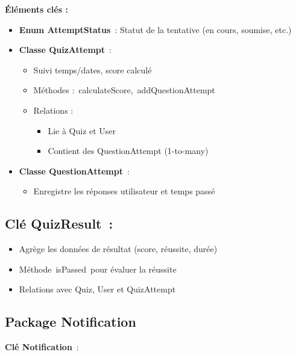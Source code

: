 \documentclass[12pt,a4paper,twoside]{report}
\begin{document}
\textbf{Éléments clés :}

\begin{itemize}
\item
  \textbf{Enum AttemptStatus}~: Statut de la tentative (en cours,
  soumise, etc.)
\item
  \textbf{Classe QuizAttempt}~:

  \begin{itemize}
  \item
    Suivi temps/dates, score calculé
  \item
    Méthodes :~calculateScore,~addQuestionAttempt
  \item
    Relations :

    \begin{itemize}
    \item
      Lie à Quiz et User
    \item
      Contient des QuestionAttempt (1-to-many)
    \end{itemize}
  \end{itemize}
\item
  \textbf{Classe QuestionAttempt}~:

  \begin{itemize}
  \item
    Enregistre les réponses utilisateur et temps passé
  \end{itemize}
\end{itemize}

\hypertarget{cluxe9-quizresult}{%
\subsection{Clé QuizResult~:}\label{cluxe9-quizresult}}

\begin{itemize}
\item
  Agrège les données de résultat (score, réussite, durée)
\item
  Méthode~isPassed~pour évaluer la réussite
\item
  Relations avec Quiz, User et QuizAttempt
\end{itemize}

\hypertarget{package-notification}{%
\subsection{\texorpdfstring{ Package
Notification}{ Package Notification}}\label{package-notification}}

\textbf{Clé Notification}~:
\end{document}
